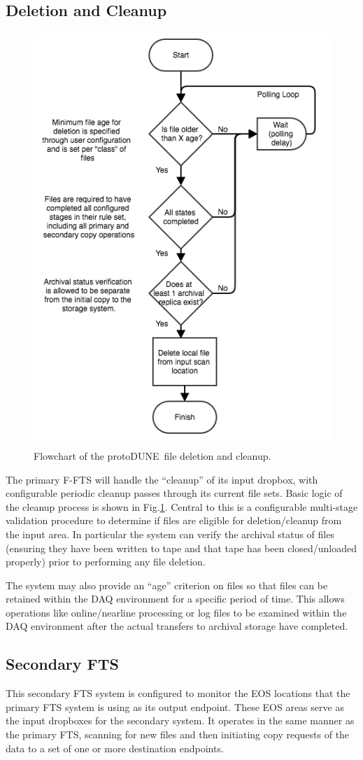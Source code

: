 \documentclass[pdftex,12pt,letter]{article}
\newcommand{\pd}{protoDUNE\ }
\begin{document}
\subsection{Deletion and Cleanup}

\begin{figure}[tbh]
\centering\includegraphics[width=0.5\linewidth]{fts_file_deletion_flowchart.png}
\caption{\label{fig:ftscleanup}Flowchart of the \pd file deletion and cleanup.}
\end{figure}
The primary F-FTS will handle the “cleanup” of its input dropbox,
with configurable periodic cleanup passes through its current file sets.  Basic logic of the cleanup process is shown in Fig.\ref{fig:ftscleanup}.
Central to this is a configurable multi-stage validation procedure to determine if files are eligible for deletion/cleanup from the input area.
In particular the system can verify the archival status of files (ensuring they have been written to tape and that tape has been closed/unloaded properly)
prior to performing any file deletion.

The system may also provide an ``age'' criterion on files so that files can be retained within the DAQ environment for a specific period of time.
This allows operations like online/nearline processing or log files to be examined within the DAQ environment after the actual transfers to archival
storage have completed.



\subsection{Secondary FTS}
This secondary FTS system is configured to monitor the EOS locations that the primary FTS system is using as its output endpoint.
These EOS areas serve as the input dropboxes for the secondary system. It operates in the same manner as the primary FTS,
scanning for new files and then initiating copy requests of the data to a set of one or more destination endpoints.
\end{document}
